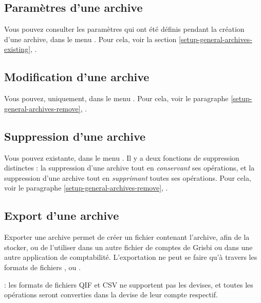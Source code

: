 \subsection{Paramètres d'une archive\label{datamanagement-history-parameters}}

Vous pouvez consulter les paramètres qui ont été définis pendant la création d'une archive, dans le menu
. Pour cela, voir la section \vref{setup-general-archives-existing}, .


\subsection{Modification d'une archive\label{datamanagement-history-modify}}

Vous pouvez, uniquement,  dans le menu . Pour cela, voir le paragraphe \vref{setup-general-archives-remove}, .


\subsection{Suppression d'une archive\label{datamanagement-history-remove}}

Vous pouvez  existante, dans le menu . Il y a deux fonctions de suppression distinctes : la suppression d'une archive tout en \emph{conservant} ses opérations, et la suppression d'une archive tout en \emph{supprimant} toutes ses opérations. Pour cela, voir le paragraphe \vref{setup-general-archives-remove}, . 


\subsection{Export d'une archive\label{datamanagement-history-export}}

Exporter une archive permet de créer un fichier contenant l'archive, afin de la stocker, ou de l'utiliser dans un autre fichier de comptes de Grisbi ou dans une autre application de comptabilité. L'exportation ne peut se faire qu'à travers les formats de fichiers ,  ou .

 : les formats de fichiers QIF et CSV ne supportent pas les devises, et toutes les opérations seront converties dans la devise de leur compte respectif.

